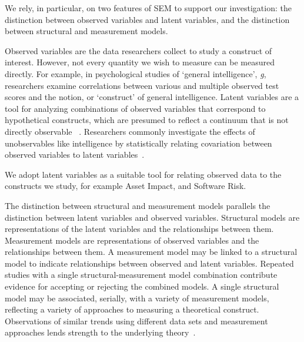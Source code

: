 We rely, in particular, on two features of SEM to support our investigation: the distinction between observed variables and latent variables, and the distinction between structural and measurement models. 

Observed variables are the data researchers collect to study a construct of interest. However, not every quantity we wish to measure can be measured directly. For example, in psychological studies of `general intelligence', \textit{g}, researchers examine correlations between various and multiple observed test scores and the notion, or `construct' of general intelligence. Latent variables are a tool for analyzing combinations of observed variables that correspond to hypothetical constructs, which are presumed to reflect a continuum that is not directly observable ~\cite{kline2015principles}. Researchers commonly investigate the effects of unobservables like intelligence by statistically relating covariation between observed variables to latent variables~\cite{borsboom2003theoretical}.  

We adopt latent variables as a suitable tool for relating observed data to the constructs we study, for example Asset Impact, and Software Risk.

The distinction between structural and measurement models parallels the distinction between latent variables and observed variables. Structural models are representations of the latent variables and the relationships between them. Measurement models are representations of observed variables and the relationships between them.  A measurement model may be linked to a structural model to indicate relationships between observed and latent variables. Repeated studies with a single structural-measurement model combination contribute evidence for accepting or rejecting the combined models. A single structural model may be associated, serially, with a variety of measurement models, reflecting a variety of approaches to measuring a theoretical construct.  Observations of similar trends using different data sets and measurement approaches lends strength to the underlying theory~\cite{basili1999building,wohlin2000experimentation}. 

